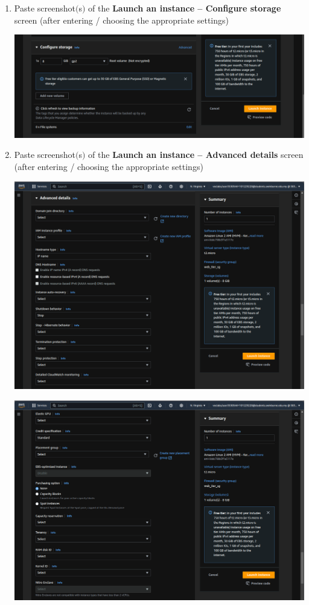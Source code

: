 \documentclass[11pt]{article}
\begin{document}
\begin{enumerate}[resume]
    \item Paste screenshot$($s$)$ of the \textbf{Launch an instance – Configure storage} screen (after entering / choosing the appropriate settings) \\
    \vspace{5mm}

    {\centering
    \includegraphics[width=5.8in]{pics/20.png}
    }



    \item Paste screenshot$($s$)$ of the \textbf{Launch an instance – Advanced details} screen (after entering / choosing the appropriate settings) \\
    \vspace{5mm}

    {\centering
    \includegraphics[width=5.8in]{pics/21a.png}
    }

    {\centering
    \includegraphics[width=5.8in]{pics/21b.png}
    }



\end{enumerate}
\end{document}
